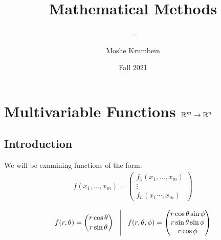 


\title{Mathematical Methods}
\author{Moshe Krumbein}
\date{Fall 2021}


\setcounter{chapter}{10}

\chapter{Multivariable Functions \texorpdfstring{$\mathbb{R}^{\lowercase{m}}
\to \mathbb{R}^{\lowercase{n}}$}{Rm to Rn}}
\subtitle{\theauthor~- \thedate}
\section{Introduction}
We will be examining functions of the form:
\begin{gather*}
    f(x_1,\dots,x_m)=\begin{pmatrix}
        f_1(x_1,\dots,x_m) \\ \vdots \\
        f_n(x_1\cdots,x_m)
    \end{pmatrix}
\end{gather*}
\begin{example}
    \begin{gather*}
        f(r,\theta)=\binom{r\cos \theta}{r \sin \theta}
        \quad \vline \quad
        f(r, \theta, \phi)=\begin{pmatrix}
            r \cos \theta \sin \phi \\
            r \sin \theta \sin \phi \\
            r \cos \phi
        \end{pmatrix}
    \end{gather*}
\end{example}
